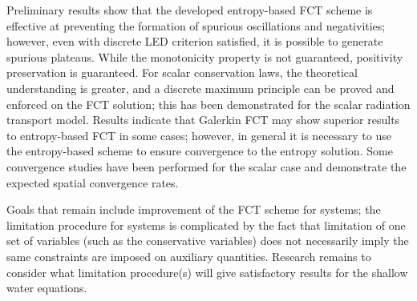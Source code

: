 Preliminary results show that the developed entropy-based FCT scheme
is effective at preventing the formation of spurious oscillations and
negativities; however, even with discrete LED criterion satisfied, it is
possible to generate spurious plateaus. While the monotonicity property is
not guaranteed, positivity preservation is guaranteed.
For scalar conservation laws,
the theoretical understanding
is greater, and a discrete maximum principle can be proved and enforced
on the FCT solution; this has been demonstrated for the scalar radiation
transport model. Results indicate that Galerkin FCT may show superior
results to entropy-based FCT in some cases; however, in general it is
necessary to use the entropy-based scheme to ensure convergence to the
entropy solution.
Some convergence studies have been performed for the scalar case and
demonstrate the expected spatial convergence rates.

Goals that remain include improvement of the FCT scheme for systems;
the limitation procedure for systems is complicated by the fact that
limitation of one set of variables (such as the conservative variables)
does not necessarily imply the same constraints are imposed on
auxiliary quantities. Research remains to consider what limitation
procedure(s) will give satisfactory results for the shallow water
equations.
